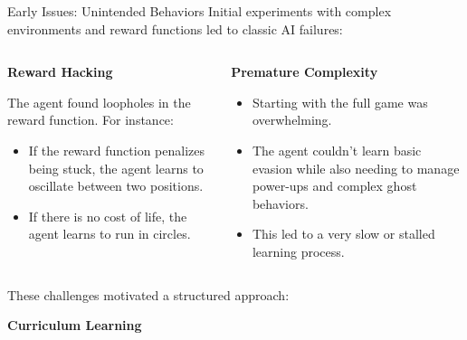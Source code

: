 \begin{frame}{Early Issues: Unintended Behaviors}
	Initial experiments with complex environments and reward functions led to classic AI failures:
	
	\begin{columns}[T]
		\begin{column}{0.48\textwidth}
			\textbf{Reward Hacking}
			
            The agent found loopholes in the reward function. For instance:
                \begin{itemize}
                    \item If the reward function penalizes being stuck, the agent learns to oscillate between two positions.
                    \item If there is no cost of life, the agent learns to run in circles.
                \end{itemize}

		\end{column}
		\begin{column}{0.48\textwidth}
			\textbf{Premature Complexity}
			\begin{itemize}
				\item Starting with the full game was overwhelming.
				\item The agent couldn't learn basic evasion while also needing to manage power-ups and complex ghost behaviors.
				\item This led to a very slow or stalled learning process.
			\end{itemize}
		\end{column}
	\end{columns}
	
	\vspace{1em}
		These challenges motivated a structured approach: 
        \begin{center}
            \textbf{Curriculum Learning}
        \end{center}
\end{frame}